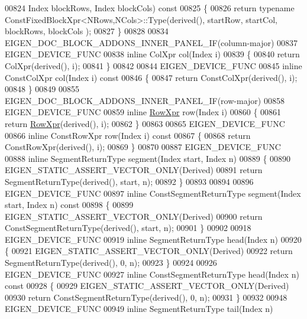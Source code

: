 \begin{DoxyCode}
00824                                                               Index blockRows, Index blockCols)\textcolor{keyword}{ const}
00825 \textcolor{keyword}{}\{
00826   \textcolor{keywordflow}{return} \textcolor{keyword}{typename} ConstFixedBlockXpr<NRows,NCols>::Type(derived(), startRow, startCol, blockRows, blockCols
      );
00827 \}
00828 
00834 EIGEN\_DOC\_BLOCK\_ADDONS\_INNER\_PANEL\_IF(column-major)
00837 EIGEN\_DEVICE\_FUNC
00838 \textcolor{keyword}{inline} ColXpr col(Index i)
00839 \{
00840   \textcolor{keywordflow}{return} ColXpr(derived(), i);
00841 \}
00842 
00844 EIGEN\_DEVICE\_FUNC
00845 \textcolor{keyword}{inline} ConstColXpr col(Index i)\textcolor{keyword}{ const}
00846 \textcolor{keyword}{}\{
00847   \textcolor{keywordflow}{return} ConstColXpr(derived(), i);
00848 \}
00849 
00855 EIGEN\_DOC\_BLOCK\_ADDONS\_INNER\_PANEL\_IF(row-major)
00858 EIGEN\_DEVICE\_FUNC
00859 \textcolor{keyword}{inline} \hyperlink{group___core___module_class_eigen_1_1_block}{RowXpr} row(Index i)
00860 \{
00861   \textcolor{keywordflow}{return} \hyperlink{group___core___module_class_eigen_1_1_block}{RowXpr}(derived(), i);
00862 \}
00863 
00865 EIGEN\_DEVICE\_FUNC
00866 \textcolor{keyword}{inline} ConstRowXpr row(Index i)\textcolor{keyword}{ const}
00867 \textcolor{keyword}{}\{
00868   \textcolor{keywordflow}{return} ConstRowXpr(derived(), i);
00869 \}
00870 
00887 EIGEN\_DEVICE\_FUNC
00888 \textcolor{keyword}{inline} SegmentReturnType segment(Index start, Index n)
00889 \{
00890   EIGEN\_STATIC\_ASSERT\_VECTOR\_ONLY(Derived)
00891   \textcolor{keywordflow}{return} SegmentReturnType(derived(), start, n);
00892 \}
00893 
00894 
00896 EIGEN\_DEVICE\_FUNC
00897 \textcolor{keyword}{inline} ConstSegmentReturnType segment(Index start, Index n)\textcolor{keyword}{ const}
00898 \textcolor{keyword}{}\{
00899   EIGEN\_STATIC\_ASSERT\_VECTOR\_ONLY(Derived)
00900   \textcolor{keywordflow}{return} ConstSegmentReturnType(derived(), start, n);
00901 \}
00902 
00918 EIGEN\_DEVICE\_FUNC
00919 \textcolor{keyword}{inline} SegmentReturnType head(Index n)
00920 \{
00921   EIGEN\_STATIC\_ASSERT\_VECTOR\_ONLY(Derived)
00922   \textcolor{keywordflow}{return} SegmentReturnType(derived(), 0, n);
00923 \}
00924 
00926 EIGEN\_DEVICE\_FUNC
00927 \textcolor{keyword}{inline} ConstSegmentReturnType head(Index n)\textcolor{keyword}{ const}
00928 \textcolor{keyword}{}\{
00929   EIGEN\_STATIC\_ASSERT\_VECTOR\_ONLY(Derived)
00930   \textcolor{keywordflow}{return} ConstSegmentReturnType(derived(), 0, n);
00931 \}
00932 
00948 EIGEN\_DEVICE\_FUNC
00949 \textcolor{keyword}{inline} SegmentReturnType tail(Index n)

\end{DoxyCode}

